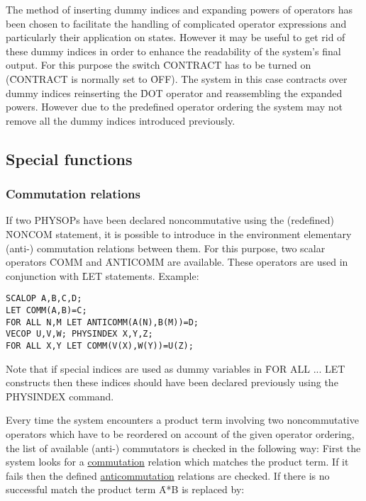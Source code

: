 The method of inserting dummy indices and expanding powers of
operators has been chosen to facilitate the handling of
complicated operator
expressions and particularly their application  on states.
However it may be useful to get rid of these
dummy indices in order to enhance the readability of the
system's final output.
For this purpose the switch \f{CONTRACT} has to
be turned on (\f{CONTRACT} is normally set to \f{OFF}).
The system in this case contracts over dummy indices reinserting the
\f{DOT} operator and reassembling the expanded powers.  However due to
the predefined operator ordering the system may not remove all the
dummy indices introduced  previously.

\subsection{Special functions}

\subsubsection{Commutation relations}

If two PHYSOPs have been declared noncommutative using the (redefined)
\f{NONCOM} statement, it is possible to introduce in the environment
elementary (anti-) commutation relations between them. For
this purpose,
two scalar operators \f{COMM} and
\f{ANTICOMM} are available.
These operators are used in conjunction with \f{LET} statements.
Example:

\begin{verbatim}
SCALOP A,B,C,D;
LET COMM(A,B)=C;
FOR ALL N,M LET ANTICOMM(A(N),B(M))=D;
VECOP U,V,W; PHYSINDEX X,Y,Z;
FOR ALL X,Y LET COMM(V(X),W(Y))=U(Z);
\end{verbatim}

Note that if special indices are used as dummy variables in
\f{FOR ALL ... LET} constructs then these indices should  have been
declared previously using the \f{PHYSINDEX} command.

Every time the system
encounters a product term involving two
noncommutative operators which have to be reordered on account of the
given operator ordering, the list of available (anti-) commutators is
checked in the following way: First the system looks for a
\underline{commutation} relation which matches the  product term. If it
fails then the defined \underline{anticommutation} relations are
checked. If there is no successful match the product term
 \f{A*B} is replaced by: \\

